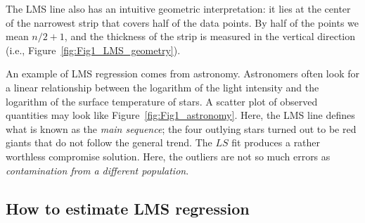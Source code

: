 The LMS line also has an intuitive geometric interpretation: it lies at the center of the narrowest 
strip that covers half of the data points.  By half of the points we mean $n/2 + 1$, and the thickness of 
the strip is measured in the vertical direction (i.e., Figure~\ref{fig:Fig1_LMS_geometry}).
	 

An example of LMS regression comes from astronomy.  Astronomers often look for a linear 
relationship between the logarithm of the light intensity and the logarithm of the surface temperature of stars.  A 
scatter plot of observed quantities may look like Figure~\ref{fig:Fig1_astronomy}.  Here, the LMS line defines what is known 
as the \emph{main sequence}; the four outlying stars turned out to be red giants that do not follow the general 
trend.  The $LS$ fit produces a rather worthless compromise solution.  Here, the outliers are not so 
much errors as \emph{contamination from a different population}.


\subsection{How to estimate LMS regression}


